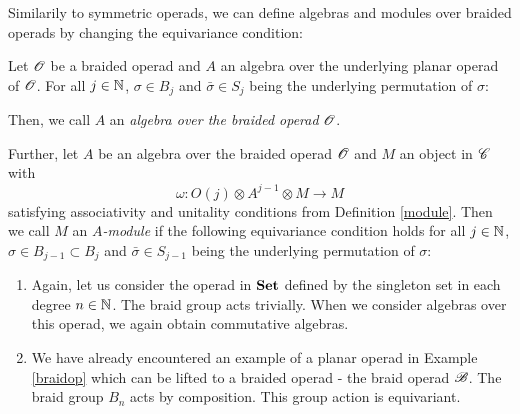 \begin{rem}
    Similarily to symmetric operads, we can define algebras and modules over
    braided operads by changing the equivariance condition:

    Let $\mathscr{O}$ be a braided operad and $A$ an algebra over the underlying planar
    operad of $\mathscr{O}$. For all $j \in \mathbb{N}$, $\sigma \in B_j$ and $\bar{\sigma} \in
    S_j$ being the underlying permutation of $\sigma$:
    \begin{center}
    \end{center}
    Then, we call $A$ an \emph{algebra over the braided operad} $\mathscr{O}$.

    Further, let $A$ be an algebra over the braided operad $\mathscr{O}$ and $M$ an
    object in $\mathscr{C}$ with
    \[
        \omega \colon O(j) \otimes A^{j-1} \otimes M \rightarrow M 
    \]
    satisfying associativity and unitality conditions from Definition
    \ref{module}. Then we call $M$ an \emph{$A$-module} if the following equivariance
    condition holds for all $j \in \mathbb{N}$, $\sigma \in B_{j-1} \subset B_j$ and
    $\bar{\sigma} \in S_{j-1}$ being the underlying permutation of $\sigma$:

    \begin{center}
                \end{center}
\end{rem}

\begin{eg}\label{eg:braidedoperads}
    \begin{enumerate}
        \item Again, let us consider the operad in $\operatorname{\textbf{Set}}$ defined by the
        singleton set in each degree $n \in \mathbb{N}$. The braid group acts trivially.
        When we consider algebras over this operad, we again obtain
        commutative algebras.
        \item We have already encountered an example of a planar operad in
        Example \ref{braidop} which can be lifted to a braided operad - the
        braid operad $\mathscr{B}$. The braid group $B_n$ acts by composition. This group
        action is equivariant.
    \end{enumerate}
    
\end{eg}

